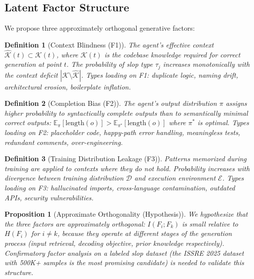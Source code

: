 \documentclass[11pt, a4paper, logo, copyright]{googledeepmind}
\newtheorem{definition}{Definition}[section]
\newtheorem{proposition}{Proposition}[section]
\begin{document}
\subsection{Latent Factor Structure}

We propose three approximately orthogonal generative factors:

\begin{definition}[Context Blindness (F1)]
The agent's effective context $\hat{\mathcal{K}}(t) \subset \mathcal{K}(t)$, where $\mathcal{K}(t)$ is the codebase knowledge required for correct generation at point $t$. The probability of slop type $\tau_j$ increases monotonically with the context deficit $|\mathcal{K} \setminus \hat{\mathcal{K}}|$. Types loading on F1: duplicate logic, naming drift, architectural erosion, boilerplate inflation.
\end{definition}

\begin{definition}[Completion Bias (F2)]
The agent's output distribution $\pi$ assigns higher probability to syntactically complete outputs than to semantically minimal correct outputs: $\mathbb{E}_\pi[\mathrm{length}(o)] > \mathbb{E}_{\pi^*}[\mathrm{length}(o)]$ where $\pi^*$ is optimal. Types loading on F2: placeholder code, happy-path error handling, meaningless tests, redundant comments, over-engineering.
\end{definition}

\begin{definition}[Training Distribution Leakage (F3)]
Patterns memorized during training are applied to contexts where they do not hold. Probability increases with divergence between training distribution $\mathcal{D}$ and execution environment $\mathcal{E}$. Types loading on F3: hallucinated imports, cross-language contamination, outdated APIs, security vulnerabilities.
\end{definition}

\begin{proposition}[Approximate Orthogonality (Hypothesis)]
\label{prop:orthogonal}
We \emph{hypothesize} that the three factors are approximately orthogonal: $I(F_i; F_k)$ is small relative to $H(F_i)$ for $i \neq k$, because they operate at different stages of the generation process (input retrieval, decoding objective, prior knowledge respectively). Confirmatory factor analysis on a labeled slop dataset (the ISSRE 2025 dataset with 500K+ samples is the most promising candidate) is needed to validate this structure.
\end{proposition}
\end{document}

